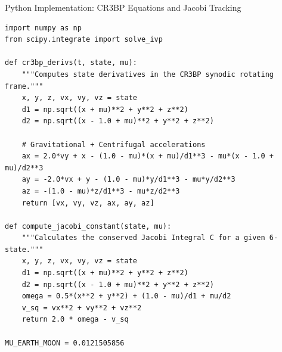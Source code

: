 \documentclass[aspectratio=169, 10pt]{beamer}
\begin{document}
\begin{frame}[fragile]{Python Implementation: CR3BP Equations and Jacobi Tracking}
\begin{lstlisting}[style=pythoncode]
import numpy as np
from scipy.integrate import solve_ivp

def cr3bp_derivs(t, state, mu):
    """Computes state derivatives in the CR3BP synodic rotating frame."""
    x, y, z, vx, vy, vz = state
    d1 = np.sqrt((x + mu)**2 + y**2 + z**2)
    d2 = np.sqrt((x - 1.0 + mu)**2 + y**2 + z**2)
    
    # Gravitational + Centrifugal accelerations
    ax = 2.0*vy + x - (1.0 - mu)*(x + mu)/d1**3 - mu*(x - 1.0 + mu)/d2**3
    ay = -2.0*vx + y - (1.0 - mu)*y/d1**3 - mu*y/d2**3
    az = -(1.0 - mu)*z/d1**3 - mu*z/d2**3
    return [vx, vy, vz, ax, ay, az]

def compute_jacobi_constant(state, mu):
    """Calculates the conserved Jacobi Integral C for a given 6-state."""
    x, y, z, vx, vy, vz = state
    d1 = np.sqrt((x + mu)**2 + y**2 + z**2)
    d2 = np.sqrt((x - 1.0 + mu)**2 + y**2 + z**2)
    omega = 0.5*(x**2 + y**2) + (1.0 - mu)/d1 + mu/d2
    v_sq = vx**2 + vy**2 + vz**2
    return 2.0 * omega - v_sq

MU_EARTH_MOON = 0.0121505856
\end{lstlisting}
\end{frame}
\end{document}
